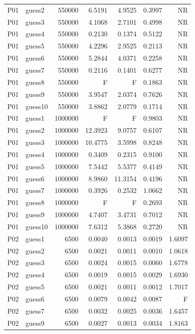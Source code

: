 {\begin{longtable}{llrrrrr}
P01 & guess2 & 550000 & 6.5191 & 4.9525 & 0.3997 & NR \\
P01 & guess3 & 550000 & 4.1068 & 2.7101 & 0.4998 & NR \\
P01 & guess4 & 550000 & 0.2130 & 0.1374 & 0.5122 & NR \\
P01 & guess5 & 550000 & 4.2296 & 2.9525 & 0.2113 & NR \\
P01 & guess6 & 550000 & 5.2844 & 4.0371 & 0.2258 & NR \\
P01 & guess7 & 550000 & 0.2116 & 0.1401 & 0.6277 & NR \\
P01 & guess8 & 550000 & F & F & 0.1863 & NR \\
P01 & guess9 & 550000 & 3.9547 & 2.0374 & 0.7626 & NR \\
P01 & guess10 & 550000 & 3.8862 & 2.0779 & 0.1714 & NR \\
P01 & guess1 & 1000000 & F & F & 0.9803 & NR \\
P01 & guess2 & 1000000 & 12.3923 & 9.0757 & 0.6107 & NR \\
P01 & guess3 & 1000000 & 10.4775 & 3.5998 & 0.8248 & NR \\
P01 & guess4 & 1000000 & 0.3409 & 0.2315 & 0.9100 & NR \\
P01 & guess5 & 1000000 & 7.5442 & 5.5377 & 0.4149 & NR \\
P01 & guess6 & 1000000 & 8.9860 & 11.3154 & 0.4196 & NR \\
P01 & guess7 & 1000000 & 0.3926 & 0.2532 & 1.0662 & NR \\
P01 & guess8 & 1000000 & F & F & 0.2693 & NR \\
P01 & guess9 & 1000000 & 4.7407 & 3.4731 & 0.7012 & NR \\
P01 & guess10 & 1000000 & 7.6312 & 5.3868 & 0.2720 & NR \\
P02 & guess1 & 6500 & 0.0040 & 0.0013 & 0.0019 & 1.6097 \\
P02 & guess2 & 6500 & 0.0021 & 0.0011 & 0.0010 & 1.0618 \\
P02 & guess3 & 6500 & 0.0024 & 0.0015 & 0.0060 & 1.6778 \\
P02 & guess4 & 6500 & 0.0019 & 0.0015 & 0.0029 & 1.6930 \\
P02 & guess5 & 6500 & 0.0021 & 0.0011 & 0.0012 & 1.7017 \\
P02 & guess6 & 6500 & 0.0079 & 0.0042 & 0.0087 & F \\
P02 & guess7 & 6500 & 0.0032 & 0.0025 & 0.0036 & 1.6457 \\
P02 & guess9 & 6500 & 0.0027 & 0.0013 & 0.0034 & 1.8163 \\

\end{longtable}}
